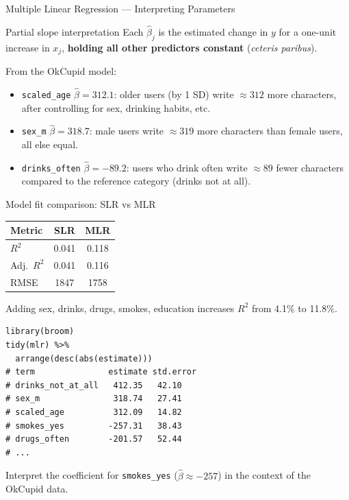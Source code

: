 \documentclass[11pt, aspectratio=169]{beamer}
\begin{document}
\begin{frame}{Multiple Linear Regression --- Interpreting Parameters}
	\begin{block}{Partial slope interpretation}
				Each $\hat\beta_j$ is the estimated change in $y$ for a one-unit
				increase in $x_j$, \textbf{holding all other predictors constant}
				(\emph{ceteris paribus}).
				\medskip

				From the OkCupid model:
				\begin{itemize}
					\item \texttt{scaled\_age} $\hat\beta = 312.1$: older users (by 1 SD)
					write $\approx 312$ more characters, after controlling for
					sex, drinking habits, etc.
					\item \texttt{sex\_m} $\hat\beta = 318.7$: male users write
					$\approx 319$ more characters than female users, all else equal.
					\item \texttt{drinks\_often} $\hat\beta = -89.2$: users who drink
					often write $\approx 89$ fewer characters compared to
					the reference category (drinks not at all).
				\end{itemize}
			\end{block}
		\begin{block}{Model fit comparison: SLR vs MLR}
				\footnotesize
				\begin{tabular}{lcc}
					\toprule
					\textbf{Metric} & \textbf{SLR} & \textbf{MLR}\\
					\midrule
					$R^2$          & 0.041 & 0.118\\
					Adj.\ $R^2$    & 0.041 & 0.116\\
					RMSE           & 1847  & 1758\\
					\bottomrule
				\end{tabular}
				\smallskip

				Adding sex, drinks, drugs, smokes, education increases
				$R^2$ from 4.1\% to 11.8\%.
			\end{block}
			\begin{lstlisting}[title={Tidy coefficient table via broom}]
library(broom)
tidy(mlr) %>%
  arrange(desc(abs(estimate)))
# term               estimate std.error
# drinks_not_at_all   412.35   42.10
# sex_m               318.74   27.41
# scaled_age          312.09   14.82
# smokes_yes         -257.31   38.43
# drugs_often        -201.57   52.44
# ...
			\end{lstlisting}
			\begin{exercise}[Exercise]
				Interpret the coefficient for \texttt{smokes\_yes} ($\hat\beta \approx -257$)
				in the context of the OkCupid data.
			\end{exercise}
		\end{frame}
\end{document}

